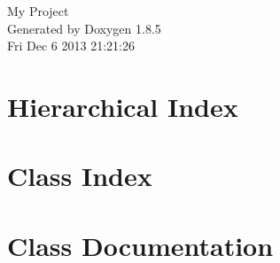 \documentclass[twoside]{book}
\newcommand{\clearemptydoublepage}{%
  \newpage{\pagestyle{empty}\cleardoublepage}%
}
\begin{document}
\hypersetup{pageanchor=false}
\begin{titlepage}
\vspace*{7cm}
\begin{center}%
{\Large My Project }\\
\vspace*{1cm}
{\large Generated by Doxygen 1.8.5}\\
\vspace*{0.5cm}
{\small Fri Dec 6 2013 21:21:26}\\
\end{center}
\end{titlepage}
\clearemptydoublepage
\tableofcontents
\clearemptydoublepage
{}
\hypersetup{pageanchor=true}

\chapter{Hierarchical Index}

\chapter{Class Index}

\chapter{Class Documentation}














































\newpage
{}
{}
\printindex
\end{document}
